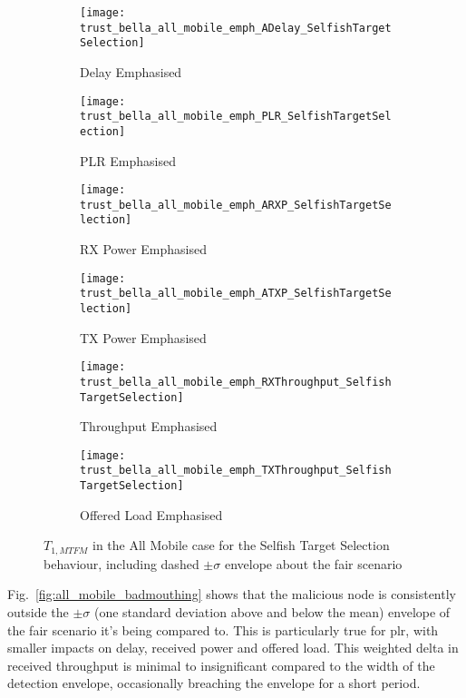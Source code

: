 \begin{figure}[h]
	\centering
	\begin{subfigure}{0.45\textwidth}	
		\texttt{[image: trust\_bella\_all\_mobile\_emph\_ADelay\_SelfishTargetSelection]} 
		\caption{Delay Emphasised}
		\label{fig:all_mobile_selfish_delay}
	\end{subfigure}
	\begin{subfigure}{0.45\textwidth}	
		\texttt{[image: trust\_bella\_all\_mobile\_emph\_PLR\_SelfishTargetSelection]}
		\caption{PLR Emphasised}
		\label{fig:all_mobile_selfish_plr}
	\end{subfigure}
	
	\begin{subfigure}{0.45\textwidth}	
		\texttt{[image: trust\_bella\_all\_mobile\_emph\_ARXP\_SelfishTargetSelection]}
		\caption{RX Power Emphasised}
		\label{fig:all_mobile_selfish_rxp}
	\end{subfigure}
	\begin{subfigure}{0.45\textwidth}
		\texttt{[image: trust\_bella\_all\_mobile\_emph\_ATXP\_SelfishTargetSelection]}
		\caption{TX Power Emphasised}
		\label{fig:all_mobile_selfish_txp}
	\end{subfigure}
	
	\begin{subfigure}{0.45\textwidth}
		\texttt{[image: trust\_bella\_all\_mobile\_emph\_RXThroughput\_SelfishTargetSelection]} 
		\caption{Throughput Emphasised}
		\label{fig:all_mobile_selfish_rxthroughput}
	\end{subfigure}
	\begin{subfigure}{0.45\textwidth}
		\texttt{[image: trust\_bella\_all\_mobile\_emph\_TXThroughput\_SelfishTargetSelection]} 
		\caption{Offered Load Emphasised}
		\label{fig:all_mobile_selfish_txthroughput}
	\end{subfigure}
	\caption{$T_{1,MTFM}$ in the All Mobile case for the Selfish Target Selection behaviour, including dashed $\pm\sigma$ envelope about the fair scenario}
	\label{fig:all_mobile_selfish}
\end{figure}

Fig.~\ref{fig:all_mobile_badmouthing} shows that the malicious node is consistently outside the $\pm\sigma$ (one standard deviation above and below the mean) envelope of the fair scenario it's being compared to.
This is particularly true for \gls{plr}, with smaller impacts on delay, received power and offered load. 
This weighted delta in received throughput is minimal to insignificant compared to the width of the detection envelope, occasionally breaching the envelope for a short period. 

